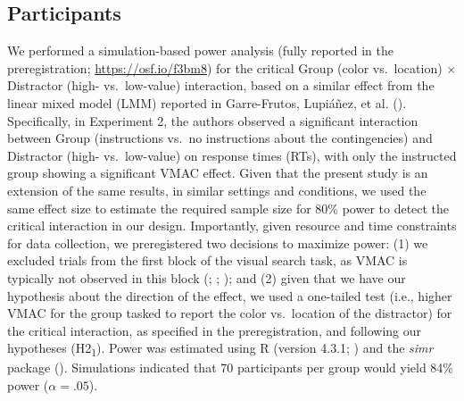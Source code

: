 \documentclass[
  man,
  floatsintext,
  longtable,
  nolmodern,
  notxfonts,
  notimes,
  mask,
  colorlinks=true,linkcolor=blue,citecolor=blue,urlcolor=blue]{apa7}
\begin{document}
\subsection{Participants}\label{participants}

We performed a simulation-based power analysis (fully reported in the
preregistration; \url{https://osf.io/f3bm8}) for the critical Group
(color vs.~location) \(\times\) Distractor (high- vs.~low-value)
interaction, based on a similar effect from the linear mixed model (LMM)
reported in Garre-Frutos, Lupiáñez, et al.
(). Specifically, in Experiment 2,
the authors observed a significant interaction between Group
(instructions vs.~no instructions about the contingencies) and
Distractor (high- vs.~low-value) on response times (RTs), with only the
instructed group showing a significant VMAC effect. Given that the
present study is an extension of the same results, in similar settings
and conditions, we used the same effect size to estimate the required
sample size for 80\% power to detect the critical interaction in our
design. Importantly, given resource and time constraints for data
collection, we preregistered two decisions to maximize power: (1) we
excluded trials from the first block of the visual search task, as VMAC
is typically not observed in this block
(;
;
);
and (2) given that we have our hypothesis about the direction of the
effect, we used a one-tailed test (i.e., higher VMAC for the group
tasked to report the color vs.~location of the distractor) for the
critical interaction, as specified in the preregistration, and following
our hypotheses (H2\textsubscript{1}). Power was estimated using R
(version 4.3.1; ) and the
\emph{simr} package ().
Simulations indicated that 70 participants per group would yield 84\%
power (\(\alpha = .05\)).
\end{document}
